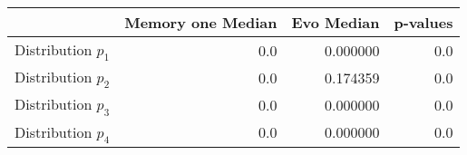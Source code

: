 \begin{tabular}{lrrr}
\toprule
{} &  Memory one Median &  Evo Median &  p-values \\
\midrule
Distribution $p_1$ &                0.0 &    0.000000 &       0.0 \\
Distribution $p_2$ &                0.0 &    0.174359 &       0.0 \\
Distribution $p_3$ &                0.0 &    0.000000 &       0.0 \\
Distribution $p_4$ &                0.0 &    0.000000 &       0.0 \\
\bottomrule
\end{tabular}
